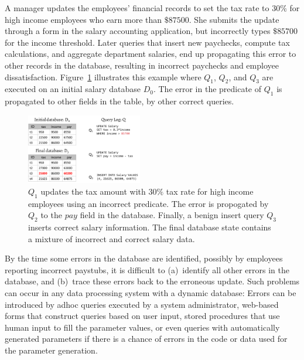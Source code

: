 \begin{example}\label{ex:telco}
  A manager updates the employees' financial records to set the tax rate to $30\%$ for high income employees who earn more than $\$87500$.
  She submits the update through a form in the salary accounting application, 
  but incorrectly types $\$85700$ for the income threshold.  
  Later queries that insert new paychecks, compute tax calculations, and
  aggregate department salaries, end up propagating this error to other records in the database, resulting in incorrect paychecks and
  employee dissatisfaction.  Figure~\ref{fig:example} illustrates this example where $Q_1$, $Q_2$, and $Q_3$ are executed on an 
  initial salary database $D_0$.  The error in the predicate of $Q_1$ is propagated to other fields in the table, by other correct queries.
\end{example}

\begin{figure}[t]
    \centering
        \includegraphics[width=0.45\textwidth]{figures/example2}
    \caption{\small $Q_1$ updates the tax amount with $30\%$ tax rate 
      for high income employees using an incorrect predicate.  
      The error is propogated by $Q_2$ to the $pay$ field in the database.
      Finally, a benign insert query $Q_3$ inserts correct salary information. 
      The final database state contains a mixture of incorrect and correct salary data.
    }
    \vspace*{-.2in}
    \label{fig:example}
\end{figure}


By the time some errors in the database are identified, possibly by
employees reporting incorrect paystubs, it is difficult to
(a)~identify all other errors in the database, and (b)~trace these
errors back to the erroneous update. Such problems can occur in any
data processing system with a dynamic database: Errors can be
introduced by adhoc queries executed by a system administrator,
web-based forms that construct queries based on user input, stored
procedures that use human input to fill the parameter values, or even
queries with automatically generated parameters if there is a chance of
errors in the code or data used for the parameter generation.
